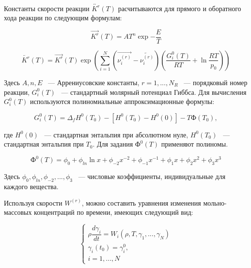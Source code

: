 Константы скорости реакции $\overleftrightarrow{K^{r}}(T)$ расчитываются для прямого и оборатного хода реакции по следующим формулам:

\begin{equation}
    \overrightarrow{K^{r}}(T) = AT^n\exp{-\dfrac{E}{T}}
    \label{eq:Kright}
\end{equation}

\begin{equation}
    \overleftarrow{K^{r}}(T) = \overrightarrow{K^{r}}(T)\exp{(\sum\limits_{i=1}^N(\overrightarrow{\nu_i^{(r)}} - \overleftarrow{\nu_i^{(r)}})(\dfrac{G_i^0(T)}{RT} + \ln{\dfrac{RT}{p_0}}))}
    \label{eq:Kleft}
\end{equation}

Здесь $A, n, E$ ~--- Аррениусовские константы, $r = 1, ..., N_R$ ~--- порядковый номер реакции, $G_i^0(T)$ ~--- стандартный молярный потенциал
Гиббса. Для вычисления $G_i^0(T)$ используются полиномиальные аппроксимационные формулы:

\begin{equation}
    G_i^0(T) = \Delta_fH^0(T_0) - [H^0(T_0) - H^0(0)] - T\text{Ф}(T_0),
    \label{eq:Gi}
\end{equation}

где $H^0(0)$ ~--- стандартная энтальпия при абсолютном нуле, $H^0(T_0)$ ~--- стандартная энтальпия при $T_0$. Для задания $\text{Ф}^0(T)$
применяют полиномы.

\begin{equation}
    \text{Ф}^0(T) = \phi_0 + \phi_{ln}\ln x + \phi_{-2}x^{-2} + \phi_{-1}x^{-1} + \phi_{1}x + \phi_{2}x^{2} + \phi_{3}x^{3}
    \label{eq:F_i}
\end{equation}

Здесь $\phi_0, \phi_{ln}, \phi_{-2}, ..., \phi_3$ ~--- числовые коэффициенты, индивидуальные для каждого вещества.

Используя скорости $W^{(r)}$, можно составить уравнения изменения мольно-массовых концентраций по времени,
имеющих следующий вид:

\begin{equation}
    \begin{cases}
        \rho \dfrac{d\gamma_i}{dt} = W_i(\rho, T, \gamma_1, ..., \gamma_N)\\
        \gamma_i(t_0) = \gamma_i^0,\\
        i = 1, ..., N
    \end{cases}
    \label{eq:GammaI}
\end{equation}


